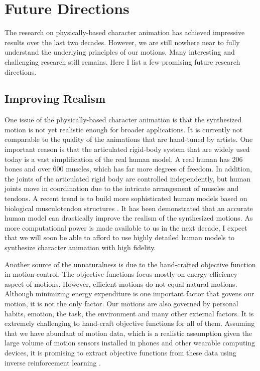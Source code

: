 \section{Future Directions}

The research on physically-based character animation has achieved impressive results over the last two decades. However, we are still nowhere near to fully understand the underlying principles of our motions. Many interesting and challenging research still remains. Here I list a few promising future research directions.

\subsection{Improving Realism}

One issue of the physically-based character animation is that the synthesized motion is not yet realistic enough for broader applications. It is currently not comparable to the quality of the animations that are hand-tuned by artists. One important reason is that the articulated rigid-body system that are widely used today is a vast simplification of the real human model. A real human has 206 bones and over 600 muscles, which has far more degrees of freedom. In addition, the joints of the articulated rigid body are controlled independently, but human joints move in coordination due to the intricate arrangement of muscles and tendons. A recent trend is to build more sophisticated human models based on biological musculotendon structures \cite{}. It has been demonstrated that an accurate human model can drastically improve the realism of the synthesized motions. As more computational power is made available to us in the next decade, I expect that we will soon be able to afford to use highly detailed human models to synthesize character animation with high fidelity.

Another source of the unnaturalness is due to the hand-crafted objective function in motion control. The objective functions focus mostly on energy efficiency aspect of motions. However, efficient motions do not equal natural motions. Although minimizing energy expenditure is one important factor that govens our motion, it is not the only factor. Our motions are also governed by personal habits, emotion, the task, the environment and many other external factors. It is extremely challenging to hand-craft objective functions for all of them. Assuming that we have abundant of motion data, which is a realistic assumption given the large volume of motion sensors installed in phones and other wearable computing devices, it is promising to extract objective functions from these data using inverse reinforcement learning \cite{}.


